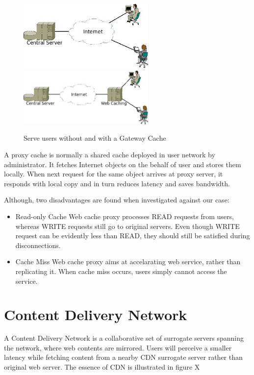 \begin{figure}[h]
\centering
\includegraphics[width=0.6\textwidth]{../images/without_caching.jpeg}
\includegraphics[width=0.6\textwidth]{../images/with_caching.jpeg}
\caption{Serve users without and with a Gateway Cache}
\label{with_cache}
\end{figure}

A proxy cache is normally a shared cache deployed in user network by administrator. It fetches Internet objects on the behalf of user and stores them locally. When next request for the same object arrives at proxy server, it responds with local copy and in turn reduces latency and saves bandwidth.

Although, two disadvantages are found when investigated against our case:
\begin{itemize}
\item Read-only Cache
Web cache proxy processes READ requests from users, whereas WRITE requests still go to original servers. Even though WRITE request can be evidently less than READ, they should still be satisfied during disconnections.
\item Cache Miss
Web cache proxy aims at accelarating web service, rather than replicating it. When cache miss occurs, users simply cannot access the service.
\end{itemize}


\section{Content Delivery Network}
A Content Delivery Network is a collaborative set of surrogate servers spanning the network, where web contents are mirrored\cite{pathan2008content}. Users will perceive a smaller latency while fetching content from a nearby CDN surrogate server rather than original web server. The essence of CDN is illustrated in figure X

